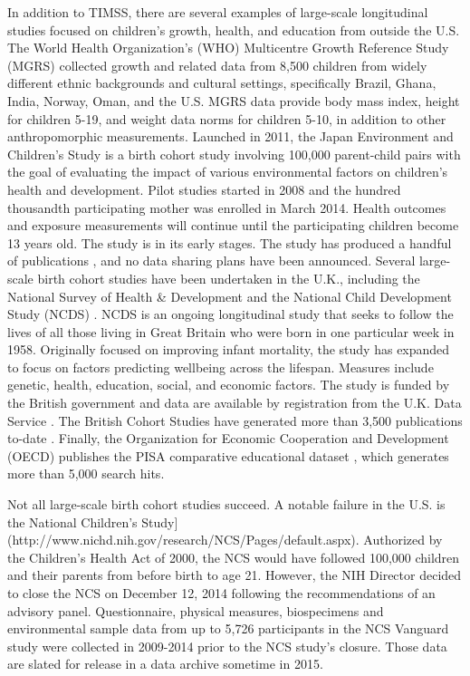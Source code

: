 \documentclass[letterpaper,man,apacite]{apa6}
\begin{document}
In addition to TIMSS, there are several examples of large-scale longitudinal studies focused on children's growth, health, and education from outside the U.S.
The World Health Organization's (WHO) Multicentre Growth Reference Study (MGRS) \cite{MGRS} collected growth and related data from 8,500 children from widely different ethnic backgrounds and cultural settings, specifically Brazil, Ghana, India, Norway, Oman, and the U.S.
MGRS data provide body mass index, height for children 5-19, and weight data norms for children 5-10, in addition to other anthropomorphic measurements.
Launched in 2011, the Japan Environment and Children's Study \cite{JECS} is a birth cohort study involving 100,000 parent-child pairs with the goal of evaluating the impact of various environmental factors on children's health and development. 
Pilot studies started in 2008 and the hundred thousandth participating mother was enrolled in March 2014. 
Health outcomes and exposure measurements will continue until the participating children become 13 years old.
The study is in its early stages.
The study has produced a handful of publications \cite{JECS_pubs}, and no data sharing plans have been announced.
Several large-scale birth cohort studies have been undertaken in the U.K., including the National Survey of Health & Development \cite{NSHD_UK} and the National Child Development Study (NCDS) \cite{NCDS_UK}.
NCDS is an ongoing longitudinal study that seeks to follow the lives of all those living in Great Britain who were born in one particular week in 1958.
Originally focused on improving infant mortality, the study has expanded to focus on factors predicting wellbeing across the lifespan.
Measures include genetic, health, education, social, and economic factors.
The study is funded by the British government and data are available by registration from the U.K. Data Service \cite{UK_cohort_data}.
The British Cohort Studies have generated more than 3,500 publications to-date \cite{UK_cohort_citations}.
Finally, the Organization for Economic Cooperation and Development (OECD) publishes the PISA comparative educational dataset \cite{PISA}, which generates more than 5,000 search hits.

Not all large-scale birth cohort studies succeed.
A notable failure in the U.S. is the National Children's Study](http://www.nichd.nih.gov/research/NCS/Pages/default.aspx).
Authorized by the Children's Health Act of 2000, the NCS would have followed 100,000 children and their parents from before birth to age 21. 
However, the NIH Director decided to close the NCS on December 12, 2014 following the recommendations of an advisory panel. 
Questionnaire, physical measures, biospecimens and environmental sample data from up to 5,726 participants in the NCS Vanguard study were collected in 2009-2014 prior to the NCS study's closure.
Those data are slated for release in a data archive sometime in 2015.
\end{document}
